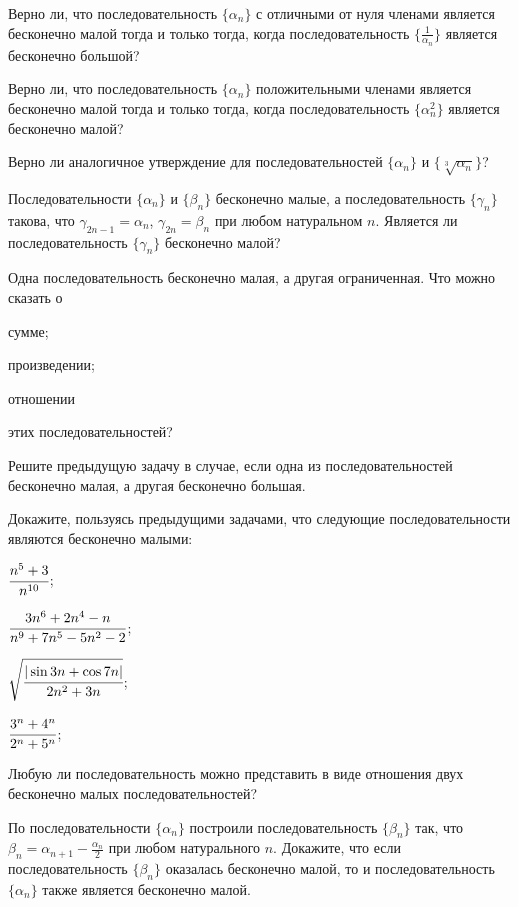 \documentclass[a4paper, 12pt, num=26]{listok}
\begin{document}
\begin{problem}
	Верно ли, что последовательность $\{\alpha_n\}$ с отличными от нуля членами является бесконечно малой тогда и только тогда,
	когда последовательность $\{\frac1{\alpha_n}\}$ является бесконечно большой?
\end{problem}
\begin{problem}
\begin{probparts}
	\item Верно ли, что последовательность $\{\alpha_n\}$ положительными членами является бесконечно малой тогда и только тогда,
	когда последовательность $\{\alpha_n^2\}$ является бесконечно малой?
	\item Верно ли аналогичное утверждение для последовательностей $\{\alpha_n\}$ и $\{\sqrt[3]{\alpha_n}\}$?
\end{probparts}
\end{problem}
\begin{problem}
	Последовательности $\{\alpha_n\}$ и $\{\beta_n\}$ бесконечно малые, а последовательность $\{\gamma_n\}$ такова,
	что $\gamma_{2n-1} = \alpha_n$, $\gamma_{2n} = \beta_n$ при любом натуральном $n$.
	Является ли последовательность $\{\gamma_n\}$ бесконечно малой?
\end{problem}
\begin{problem}
	Одна последовательность бесконечно малая, а другая ограниченная.
	Что можно сказать о
	\begin{probparts}
		\item сумме;
		\item произведении;
		\item отношении
	\end{probparts}
	этих последовательностей?
\end{problem}
\begin{problem}
	Решите предыдущую задачу в случае, если одна из последовательностей бесконечно малая, а другая бесконечно большая.
\end{problem}
\begin{problem}
	Докажите, пользуясь предыдущими задачами, что следующие последовательности являются бесконечно малыми:
	\begin{multienum}{4}
		\item $\cfrac{n^5 + 3}{n^{10}}$;
		\item $\cfrac{3n^6 + 2n^4 - n}{n^9 + 7n^5 - 5n^2 - 2}$;
		\item $\sqrt{\cfrac{|\sin{3n} + \cos{7n}|}{2n^2 + 3n}}$;
		\item $\cfrac{3^n + 4^n}{2^n + 5^n}$;
	\end{multienum}
\end{problem}
\begin{problem}
	Любую ли последовательность можно представить в виде отношения двух бесконечно малых последовательностей?
\end{problem}
\begin{problem}
	По последовательности $\{\alpha_n\}$ построили последовательность $\{\beta_n\}$ так, что 
	$\beta_n = \alpha_{n + 1} - \frac{\alpha_n}2$ при любом натурального $n$.
	Докажите, что если последовательность $\{\beta_n\}$ оказалась бесконечно малой,
	то и последовательность $\{\alpha_n\}$ также является бесконечно малой.
\end{problem}
\end{document}
